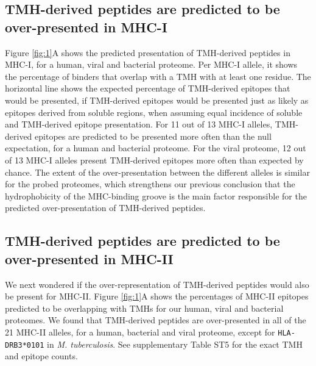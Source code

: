 \documentclass[utf8]{frontiersSCNS} %
\begin{document}
\subsection{TMH-derived peptides are predicted to be over-presented in MHC-I}

Figure \ref{fig:1}A shows the predicted presentation of TMH-derived peptides in MHC-I,
for a human, viral and bacterial proteome.
Per MHC-I allele, it shows the percentage of binders that overlap with a TMH 
with at least one residue.
The horizontal line shows the expected percentage of TMH-derived epitopes 
that would be presented, if TMH-derived epitopes would be presented just as 
likely as epitopes derived from soluble regions,
when assuming equal incidence of soluble and TMH-derived epitope presentation.
For 11 out of 13 MHC-I alleles, TMH-derived epitopes are predicted to be presented more often 
than the null expectation, for a human and bacterial proteome.
For the viral proteome, 12 out of 13 MHC-I alleles present
TMH-derived epitopes more often than expected by chance.
The extent of the over-presentation between the different alleles
is similar for the probed proteomes, 
which strengthens our previous conclusion \citep{bianchi2017} 
that the hydrophobicity of the MHC-binding groove 
is the main factor responsible for the predicted over-presentation 
of TMH-derived peptides.



\subsection{TMH-derived peptides are predicted to be over-presented in MHC-II}

We next wondered if the over-representation of TMH-derived peptides would also be present for MHC-II.
Figure \ref{fig:1}A shows the percentages of MHC-II epitopes 
predicted to be overlapping with TMHs for our human, viral and bacterial proteomes.
We found that TMH-derived peptides are over-presented in all
of the 21 MHC-II alleles, 
for a human, bacterial and viral proteome,
except for \verb;HLA-DRB3*0101; in \emph{M. tuberculosis}.
See supplementary Table ST5 
for the exact TMH and epitope counts.

\end{document}
